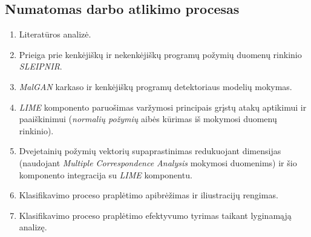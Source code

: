 \subsection{Numatomas darbo atlikimo procesas}

\begin{enumerate}
    \item Literatūros analizė.
    \item Prieiga prie kenkėjiškų ir nekenkėjiškų programų požymių duomenų rinkinio \textit{SLEIPNIR}.
    \item \textit{MalGAN} karkaso ir kenkėjiškų programų detektoriaus modelių mokymas.
    \item \textit{LIME} komponento paruošimas varžymosi principais grįstų atakų aptikimui ir paaiškinimui (\textit{normalių požymių} aibės kūrimas iš mokymosi duomenų rinkinio).
    \item Dvejetainių požymių vektorių supaprastinimas redukuojant dimensijas (naudojant \textit{Multiple Correspondence Analysis} mokymosi duomenims) ir šio komponento integracija su \textit{LIME} komponentu.
    \item Klasifikavimo proceso praplėtimo apibrėžimas ir iliustracijų rengimas.
    \item Klasifikavimo proceso praplėtimo efektyvumo tyrimas taikant lyginamąją analizę.
\end{enumerate}